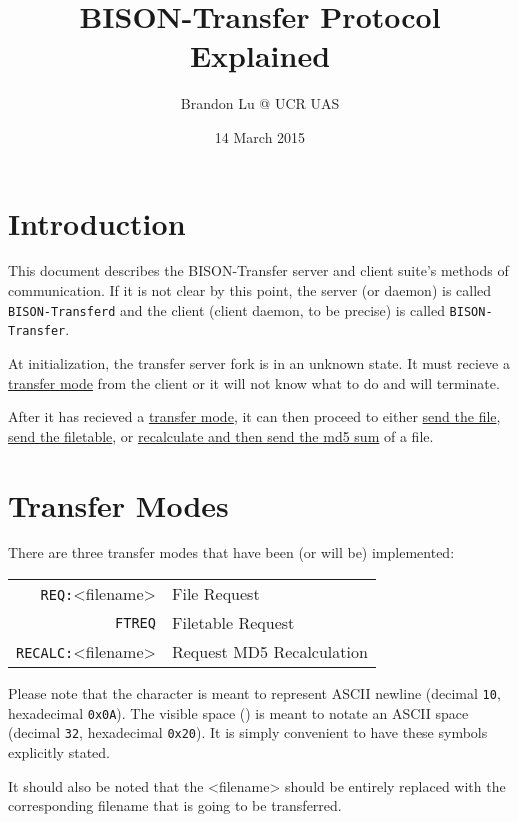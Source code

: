 \documentclass[12pt]{article}
\author{Brandon Lu @ UCR UAS}
\title{BISON-Transfer Protocol Explained}
\date{14 March 2015}
\begin{document}
\maketitle
\section{Introduction}
This document describes the BISON-Transfer server and client suite's methods
of communication.  If it is not clear by this point, the server (or daemon)
is called \verb+BISON-Transferd+ and the client (client daemon, to be precise)
is called \verb+BISON-Transfer+.

At initialization, the transfer server fork is in an unknown state.  It must
recieve a \hyperref[sec:Transfer Modes]{transfer mode} from the client or it
will not know what to
do and will terminate.

After it has recieved a \hyperref[sec:Transfer Modes]{transfer mode}, it can
then proceed to either \hyperref[ssec:Request File]{send the file},
\hyperref[ssec:Request Filetable]{send the filetable},
or \hyperref[ssec:Recalculate MD5]
{recalculate and then send the md5 sum} of a file. 

\tableofcontents

\section{Transfer Modes}
\label{sec:Transfer Modes}
There are three transfer modes that have been (or will be) implemented:
\begin{center}
	\begin{tabular}{r l}
		\verb+REQ:+\textvisiblespace <filename>\carriagereturn\carriagereturn
		& File Request\\
		\verb+FTREQ+\carriagereturn\carriagereturn & Filetable Request \\
		\verb+RECALC:+\textvisiblespace <filename>\carriagereturn
		\carriagereturn & Request MD5 Recalculation
	\end{tabular}
\end{center}

Please note that the \carriagereturn character is meant to represent ASCII
newline (decimal \verb+10+, hexadecimal \verb+0x0A+).  The
visible space (\textvisiblespace) is meant to notate an ASCII space (decimal
\verb+32+, hexadecimal \verb+0x20+).
It is simply convenient to have these symbols explicitly stated.

It should also be noted that the <filename> should be entirely replaced with
the corresponding filename that is going to be transferred.
\end{document}
